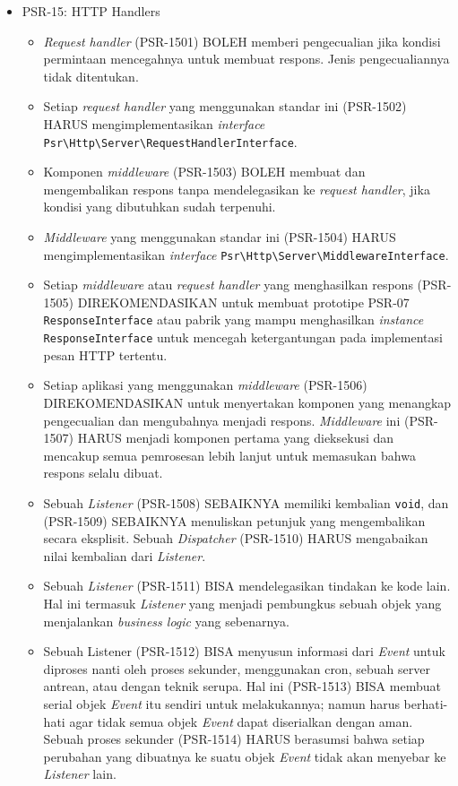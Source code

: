 \documentclass[a4paper,twoside]{article}
\begin{document}
\begin{enumerate}
\begin{enumerate}
\begin{itemize}
				\item PSR-15: HTTP Handlers
				\begin{itemize}
					\item \textit{Request handler} (PSR-1501) BOLEH memberi pengecualian jika kondisi permintaan mencegahnya untuk membuat respons. Jenis pengecualiannya tidak ditentukan.
					\item Setiap \textit{request handler} yang menggunakan standar ini (PSR-1502) HARUS mengimplementasikan \textit{interface} \verb|Psr\Http\Server\RequestHandlerInterface|.
					\item Komponen \textit{middleware} (PSR-1503) BOLEH membuat dan mengembalikan respons tanpa mendelegasikan ke \textit{request handler}, jika kondisi yang dibutuhkan sudah terpenuhi.
					\item \textit{Middleware} yang menggunakan standar ini (PSR-1504) HARUS mengimplementasikan \textit{interface} \verb|Psr\Http\Server\MiddlewareInterface|.
					\item Setiap \textit{middleware} atau \textit{request handler} yang menghasilkan respons (PSR-1505) DIREKOMENDASIKAN untuk membuat prototipe PSR-07 \verb|ResponseInterface| atau pabrik yang mampu menghasilkan \textit{instance} \verb|ResponseInterface| untuk mencegah ketergantungan pada implementasi pesan HTTP tertentu.
					\item Setiap aplikasi yang menggunakan \textit{middleware} (PSR-1506) DIREKOMENDASIKAN untuk menyertakan komponen yang menangkap pengecualian dan mengubahnya menjadi respons. \textit{Middleware} ini (PSR-1507) HARUS menjadi komponen pertama yang dieksekusi dan mencakup semua pemrosesan lebih lanjut untuk memasukan bahwa respons selalu dibuat. 
					\item Sebuah \textit{Listener} (PSR-1508) SEBAIKNYA memiliki kembalian \verb|void|, dan (PSR-1509) SEBAIKNYA menuliskan petunjuk yang mengembalikan secara eksplisit. Sebuah \textit{Dispatcher} (PSR-1510) HARUS mengabaikan nilai kembalian dari \textit{Listener}.
					\item Sebuah \textit{Listener} (PSR-1511) BISA mendelegasikan tindakan ke kode lain. Hal ini termasuk \textit{Listener} yang menjadi pembungkus sebuah objek yang menjalankan \textit{business logic} yang sebenarnya.
					\item Sebuah Listener (PSR-1512) BISA menyusun informasi dari \textit{Event} untuk diproses nanti oleh proses sekunder, menggunakan cron, sebuah server antrean, atau dengan teknik serupa. Hal ini (PSR-1513) BISA membuat serial objek \textit{Event} itu sendiri untuk melakukannya; namun harus berhati-hati agar tidak semua objek \textit{Event} dapat diserialkan dengan aman. Sebuah proses sekunder (PSR-1514) HARUS berasumsi bahwa setiap perubahan yang dibuatnya ke suatu objek \textit{Event} tidak akan menyebar ke \textit{Listener} lain. 
				\end{itemize}
				

\end{itemize}
\end{enumerate}
\end{enumerate}
\end{document}
